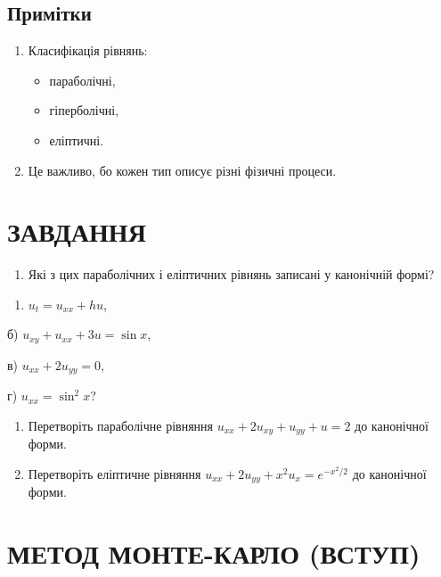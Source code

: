 \documentclass[
  ukrainian,
]{article}
\providecommand{\tightlist}{%
  \setlength{\itemsep}{0pt}\setlength{\parskip}{0pt}}
\begin{document}
\subsection{Примітки}\label{ux43fux440ux438ux43cux456ux442ux43aux438-2}

\begin{enumerate}
\def\labelenumi{\arabic{enumi}.}
\tightlist
\item
  Класифікація рівнянь:

  \begin{itemize}
  \tightlist
  \item
    параболічні,
  \item
    гіперболічні,
  \item
    еліптичні.
  \end{itemize}
\item
  Це важливо, бо кожен тип описує різні фізичні процеси.
\end{enumerate}

\section{ЗАВДАННЯ}\label{ux437ux430ux432ux434ux430ux43dux43dux44f-11}

\begin{enumerate}
\def\labelenumi{\arabic{enumi}.}
\tightlist
\item
  Які з цих параболічних і еліптичних рівнянь записані у канонічній
  формі?
\end{enumerate}

\begin{enumerate}
\def\labelenumi{\alph{enumi})}
\tightlist
\item
  \(u_t = u_{xx} + hu\),
\end{enumerate}

б) \(u_{xy} + u_{xx} + 3u = \sin x\),

в) \(u_{xx} + 2u_{yy} = 0\),

г) \(u_{xx} = \sin^2 x\)?

\begin{enumerate}
\def\labelenumi{\arabic{enumi}.}
\setcounter{enumi}{1}
\item
  Перетворіть параболічне рівняння \(u_{xx} + 2u_{xy} + u_{yy} + u = 2\)
  до канонічної форми.
\item
  Перетворіть еліптичне рівняння
  \(u_{xx} + 2u_{yy} + x^2 u_x = e^{-x^2/2}\) до канонічної форми.
\end{enumerate}

\section{МЕТОД МОНТЕ-КАРЛО
(ВСТУП)}\label{ux43cux435ux442ux43eux434-ux43cux43eux43dux442ux435-ux43aux430ux440ux43bux43e-ux432ux441ux442ux443ux43f}
\end{document}
